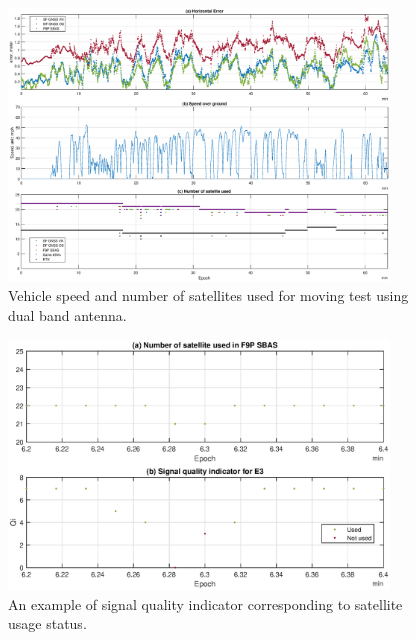 \documentclass[letterpaper, 10 pt,onecolumn]{article}
\begin{document}
	\begin{figure}[H]
		\centering
		\includegraphics[width=0.9\textwidth]{figures/dynamicinfo_dual.eps}
		\caption{Vehicle speed and number of satellites used for moving test using dual band antenna.}
		\label{fig:m2vspeed}
	\end{figure}

	\begin{figure}[H]		
		\centering		
		\includegraphics[width=0.9\textwidth]{figures/Qi.eps}		
		\caption{An example of signal quality indicator corresponding to satellite usage status.}		
		\label{fig:qi}	
	\end{figure}

    
    
\end{document}

